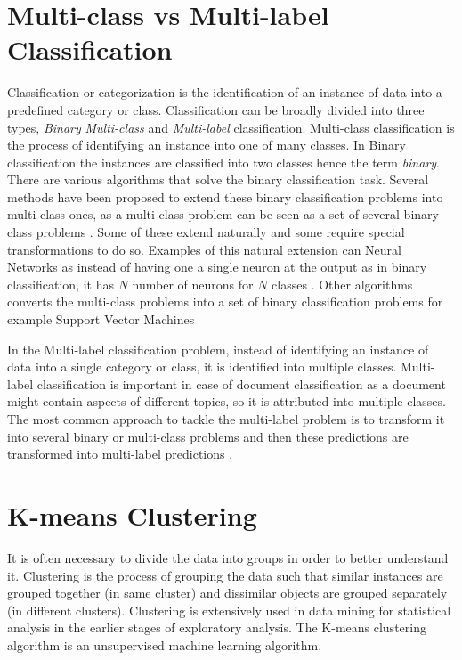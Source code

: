 
\section{Multi-class vs Multi-label Classification}
Classification or categorization is the identification of an instance of data into a predefined category or class. Classification can be broadly divided into three types, \textit{Binary} \textit{Multi-class} and \textit{Multi-label} classification. Multi-class classification is the process of identifying an instance into one of many classes. In Binary classification the instances are classified into two classes hence the term \textit{binary}. There are various algorithms that solve the binary classification task. Several methods have been proposed to extend these binary classification problems into multi-class ones, as a multi-class problem can be seen as a set of several binary class problems \cite{aly2005survey}. Some of these extend naturally and some require special transformations to do so. Examples of this natural extension can Neural Networks as instead of having one a single neuron at the output as in binary classification, it has $N$ number of neurons for $N$ classes  \cite{bishop1995neural}. Other algorithms converts the multi-class problems into a set of binary classification problems for example Support Vector Machines \cite{cortes1995support}

In the Multi-label classification problem, instead of identifying an instance of data into a single category or class, it is identified into multiple classes. Multi-label classification is important in case of document classification as a document might contain aspects of different topics, so it is attributed into multiple classes. The most common approach to tackle the multi-label problem is to transform it into several binary or multi-class problems and then these predictions are transformed into multi-label predictions \cite{read2011classifier}.

\section{K-means Clustering}
It is often necessary to divide the data into groups in order to better understand it. Clustering is the process of grouping the data such that similar instances are grouped together (in same cluster) and dissimilar objects are grouped separately (in different clusters). Clustering is extensively used in data mining for statistical analysis in the earlier stages of exploratory analysis. The K-means clustering algorithm is an unsupervised machine learning algorithm. 

